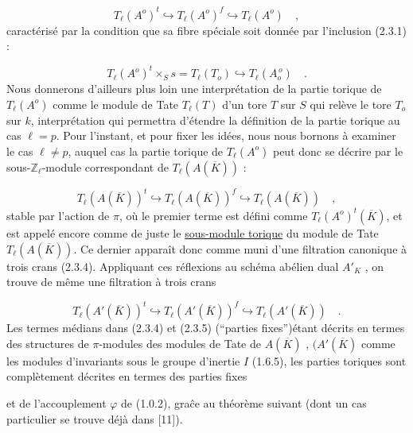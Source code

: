 \begin{equation}\tag{2.3.2}
T_\ell(A^o)^t \hookrightarrow T_\ell(A^o)^f \hookrightarrow T_\ell(A^o) \quad ,
\end{equation}
caractérisé par la condition que sa fibre spéciale soit donnée par l'inclusion (2.3.1) :

\begin{equation}\tag{2.3.3}
T_\ell(A^o)^t \times_S s = T_\ell(T_o) \hookrightarrow T_\ell(A_o^{\,o}) \quad .
\end{equation}
Nous donnerons d'ailleurs plus loin une interprétation de la partie torique de $T_\ell(A^o)$ comme le module de Tate $T_\ell(T)$ d'un tore $T$ sur $S$ qui relève le tore $T_o$ sur $k$, interprétation qui permettra d'étendre la définition de la partie torique au cas $\ell = p$. Pour l'instant, et pour fixer les idées, nous nous bornons à examiner le cas $\ell \neq p$, auquel cas la partie torique de $T_\ell(A^o)$ peut donc se décrire par le sous-$\mathbb{Z}_\ell$-module correspondant de $T_\ell(A(\overline{K}))$ :

\begin{equation}\tag{2.3.4}
T_\ell(A(\overline{K}))^t \hookrightarrow T_\ell(A(\overline{K}))^f \hookrightarrow T_\ell(A(\overline{K})) \quad ,
\end{equation}
stable par l'action de $\pi$, où le premier terme est défini comme $T_\ell(A^o)^t(\overline{K})$, et est appelé encore comme de juste le \underline{sous-module torique} du module de Tate $T_\ell(A(\overline{K}))$. Ce dernier apparaît donc comme muni d'une filtration canonique à trois crans (2.3.4). Appliquant ces réflexions au schéma abélien dual $A'_K$ , on trouve de même une filtration à trois crans

\begin{equation}\tag{2.3.5}
T_\ell(A'(\overline{K}))^t \hookrightarrow T_\ell(A'(\overline{K}))^f \hookrightarrow T_\ell(A'(\overline{K})) \quad .
\end{equation}
Les termes médians dans (2.3.4) et (2.3.5) (``parties fixes'')étant décrits en termes des structures de $\pi$-modules des modules de Tate de $A(\overline{K})$ , $(A'(\overline{K})$ comme les modules d'invariants sous le groupe d'inertie $I$ (1.6.5), les parties toriques sont complètement décrites en termes des parties fixes



et de l'accouplement $\varphi$ de (1.0.2), gra\^ce au théorème suivant (dont un cas particulier se trouve déjà dans [11]).

